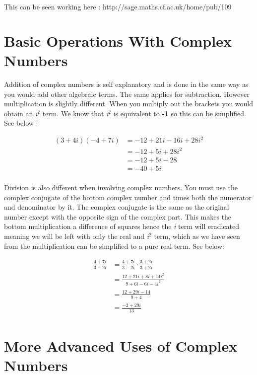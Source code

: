 This can be seen working here : http://sage.maths.cf.ac.uk/home/pub/109 

\small

\section{Basic Operations With Complex Numbers}

Addition of complex numbers is self explanatory and is done in the same way as you would add other algebraic terms. The same applies for subtraction. However multiplication is slightly different. When you multiply out the brackets you would obtain an \textit{i}$^2$ term. We know that \textit{i}$^2$ is equivalent to \textbf{-1} so this can be simplified. See below :

\begin{align}
(3+4i)(-4+7i) & =-12+21i-16i+28i^2\nonumber\\
			  & =-12+5i+28i^2\nonumber\\
              & =-12+5i-28\nonumber\\
              & =-40+5i\nonumber\\
\end{align}

Division is also different when involving complex numbers. You must use the complex conjugate of the bottom complex number and times both the numerator and denominator by it. The complex conjugate is the same as the original number except with the opposite sign of the complex part. This makes the bottom multiplication a difference of squares hence the \textit{i} term will eradicated meaning we will be left with only the real and \textit{i}$^2$ term, which as we have seen from the multiplication can be simplified to a pure real term. See below:

\begin{align}
\frac{4+7i}{3-2i}\nonumber & = \frac{4+7i}{3-2i} \cdot \frac{3+2i}{3+2i}\nonumber\\
				  & = \frac{12+21i+8i+14i^2}{9+6i-6i-4i^2}\nonumber\\
                  & = \frac{12+29i-14}{9+4}\nonumber\\
                  & = \frac{-2+29i}{13}\nonumber\\
\end{align}

\section{More Advanced Uses of Complex Numbers}

